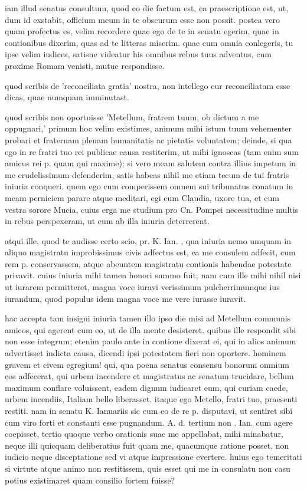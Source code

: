  iam illud senatus consultum, quod eo die factum est, ea praescriptione est, ut, dum id exstabit, officium meum in te obscurum esse non possit. postea vero quam profectus es, velim recordere quae ego de te in senatu egerim, quae in contionibus dixerim, quas ad te litteras miserim. quae cum omnia conlegeris, tu ipse velim iudices, satisne videatur his omnibus rebus tuus adventus, cum proxime Romam venisti, mutue respondisse.

 quod scribis de 'reconciliata gratia' nostra, non intellego cur reconciliatam esse dicas, quae numquam imminutast.

 quod scribis non oportuisse 'Metellum, fratrem tuum, ob dictum a me oppugnari,' primum hoc velim existimes, animum mihi istum tuum vehementer probari et fraternam plenam humanitatis ac pietatis voluntatem; deinde, si qua ego in re fratri tuo rei publicae causa restiterim, ut mihi ignoscas (tam enim sum amicus rei p. quam qui maxime); si vero meam salutem contra illius impetum in me crudelissimum defenderim, satis habeas nihil me etiam tecum de tui fratris iniuria conqueri. quem ego cum comperissem omnem sui tribunatus conatum in meam perniciem parare atque meditari, egi cum Claudia, uxore tua, et cum vestra sorore Mucia, cuius erga me studium pro Cn. Pompei necessitudine multis in rebus perspexeram, ut eum ab illa iniuria deterrerent.

 atqui ille, quod te audisse certo scio, pr. K. Ian. , qua iniuria nemo umquam in aliquo magistratu improbissimus civis adfectus est, ea me consulem adfecit, cum rem p. conservassem, atque abeuntem magistratu contionis habendae potestate privavit. cuius iniuria mihi tamen honori summo fuit; nam cum ille mihi nihil nisi ut iurarem permitteret, magna voce iuravi verissimum pulcherrimumque ius iurandum, quod populus idem magna voce me vere iurasse iuravit.

 hac accepta tam insigni iniuria tamen illo ipso die misi ad Metellum communis amicos, qui agerent cum eo, ut de illa mente desisteret. quibus ille respondit sibi non esse integrum; etenim paulo ante in contione dixerat ei, qui in alios animum advertisset indicta causa, dicendi ipsi potestatem fieri non oportere. hominem gravem et civem egregium! qui, qua poena senatus consensu bonorum omnium eos adfecerat, qui urbem incendere et magistratus ac senatum trucidare, bellum maximum conflare voluissent, eadem dignum iudicaret eum, qui curiam caede, urbem incendiis, Italiam bello liberasset. itaque ego Metello, fratri tuo, praesenti restiti. nam in senatu K. Ianuariis sic cum eo de re p. disputavi, ut sentiret sibi cum viro forti et constanti esse pugnandum. A. d. tertium non . Ian. cum agere coepisset, tertio quoque verbo orationis suae me appellabat, mihi minabatur, neque illi quicquam deliberatius fuit quam me, quacumque ratione posset, non iudicio neque disceptatione sed vi atque impressione evertere. huius ego temeritati si virtute atque animo non restitissem, quis esset qui me in consulatu non casu potius existimaret quam consilio fortem fuisse?

